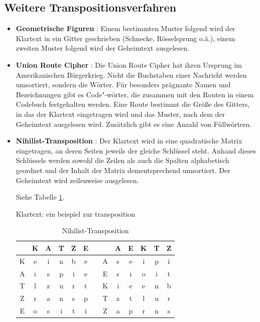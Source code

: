 \begin{refsegment}
\subsection{Weitere Transpositionsverfahren}

\begin{itemize}

\item {\bf Geometrische Figuren} \cite{Goebel2014}: Einem bestimmten Muster
   folgend wird der Klartext in ein Gitter geschrieben (Schnecke, Rösselsprung
   o.ä.), einem zweiten Muster folgend wird der Geheimtext ausgelesen.

\item {\bf Union Route Cipher} \cite{Goebel2014}: Die Union Route Cipher hat
   ihren Ursprung im Amerikanischen Bürgerkrieg. Nicht die Buchstaben einer
   Nachricht werden umsortiert, sondern die Wörter. Für besonders prägnante
   Namen und Bezeichnungen gibt es Code"-wörter, die zusammen mit den Routen
   in einem Codebuch festgehalten werden. Eine Route bestimmt die Größe des
   Gitters, in das der Klartext eingetragen wird und das Muster, nach dem der
   Geheimtext ausgelesen wird. Zusätzlich gibt es eine Anzahl von
   Füllwörtern.

\item {\bf Nihilist-Transposition} \cite{ACA2002}%
   :
   Der Klartext wird in eine
   quadratische Matrix eingetragen, an deren Seiten jeweils der gleiche
   Schlüssel steht. Anhand dieses Schlüssels werden sowohl die Zeilen als
   auch die Spalten alphabetisch geordnet und der Inhalt der Matrix
   dementsprechend umsortiert. Der Geheimtext wird zeilenweise ausgelesen.

   Siehe Tabelle \ref{PaP_NihilistTransp_table-reference}.

   Klartext: ein beispiel zur transposition

   \begin{table}[ht]
   \begin{center}
   \begin{tabular}{|c|ccccc||cc|ccccc|}
   \hline
	  & K & A & T & Z & E &   &   & A & E & K & T & Z\\
   \hline
	K & e & i & n & b & e &   & A & s & e & i & p & i\\
	A & i & s & p & i & e &   & E & s & i & o & i & t\\
	T & l & z & u & r & t &   & K & i & e & e & n & b\\
	Z & r & a & n & s & p &   & T & z & t & l & u & r\\
	E & o & s & i & t & i &   & Z & a & p & r & n & s\\
   \hline
   \end{tabular}
   \caption[Nihilist-Transposition]{Nihilist-Transposition\footnotemark}
   \label{PaP_NihilistTransp_table-reference}
   \end{center}
   \end{table}


\end{itemize}
\end{refsegment}
